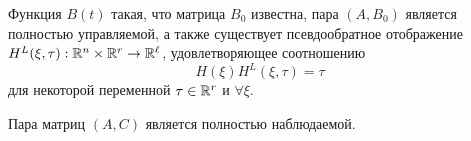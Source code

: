 \begin{frame} \hypertarget{slide\insertframenumber}{}
	\begin{assumption}
		\label{ass1}
		Функция $B(t)$ такая, что матрица $B_0$ известна, пара $(A,B_0)$ является полностью управляемой, а также существует псевдообратное отображение $H^L(\xi,\tau):\mathbb{R}^n\times\mathbb{R}^r\to\mathbb{R}^\ell$, удовлетворяющее соотношению
		\[	H\left(\xi\right)H^L(\xi,\tau)=\tau \]	
		для некоторой переменной $\tau\in\mathbb{R}^r$ и $\forall\xi$.
	\end{assumption}
	\begin{assumption}
		\label{ass2}
		Пара матриц $(A, C)$ является полностью наблюдаемой.
	\end{assumption}
\end{frame}